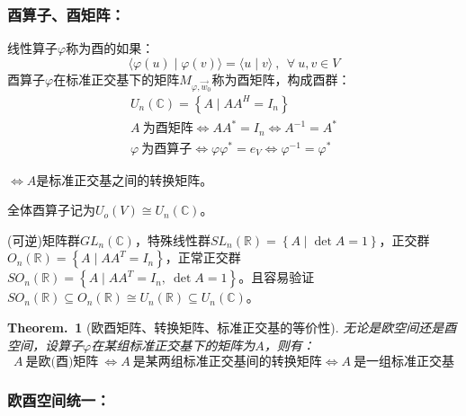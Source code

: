 \documentclass[zihao=5,UTF8]{report}
\theoremstyle{mystyle} %
\newtheorem{theorem}{Theorem.\,}
\begin{document}
\subsubsection{酉算子、酉矩阵：}
线性算子$\varphi$称为酉的如果：
\begin{equation*}
    \langle \varphi(u) \mid \varphi(v) \rangle = \langle u \mid v \rangle\ ,\ \ \forall\ u,v \in V
\end{equation*}
酉算子$\varphi$在标准正交基下的矩阵$M_{\varphi,\vec{w}_0}$称为酉矩阵，构成酉群：
\begin{gather*}
    U_n(\mathbb{C})  = \left\{A\mid AA^H = I_n\right\}\\
    A\ \text{为酉矩阵} \Longleftrightarrow AA^*= I_n \Longleftrightarrow A^{-1} = A^* \\
    \varphi\ \text{为酉算子} \Longleftrightarrow \varphi\varphi^* = e_V \Longleftrightarrow \varphi^{-1} = \varphi^* 
\end{gather*}
{\par\color{gray}\small
$\Longleftrightarrow A$是标准正交基之间的转换矩阵。
\par}

全体酉算子记为$U_o(V) \cong U_n(\mathbb{C})$。
{\par\color{gray}\small
(可逆)矩阵群$GL_n(\mathbb{C})$，特殊线性群$SL_n(\mathbb{R}) = \left\{A\mid \det A = 1 \right\}$，正交群$O_n(\mathbb{R}) = \left\{ A\mid AA^T = I_n\right\}$，正常正交群$SO_n(\mathbb{R}) = \left\{ A\mid AA^T = I_n,\ \det A = 1\right\}$。且容易验证$SO_n(\mathbb{R}) \subseteq O_n(\mathbb{R}) \cong U_n(\mathbb{R}) \subseteq U_n(\mathbb{C}) $。
\par}
\begin{theorem}[欧酉矩阵、转换矩阵、标准正交基的等价性]\label{欧酉矩阵、转换矩阵、标准正交基的等价性}
    无论是欧空间还是酉空间，设算子$\varphi$在某组标准正交基下的矩阵为$A$，则有：
\begin{equation*}
    A\ \text{是欧(酉)矩阵}\ \Longleftrightarrow  A\ \text{是某两组标准正交基间的转换矩阵} \Longleftrightarrow  A\ \text{是一组标准正交基} 
\end{equation*}
\end{theorem}

\subsubsection{\color{red}欧酉空间统一：}
\end{document}
